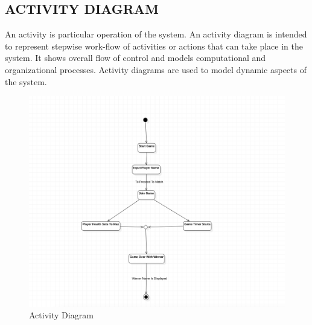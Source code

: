 \documentclass[12pt]{report}
\begin{document}
\subsection{ACTIVITY DIAGRAM}
An activity is particular operation of the system. An activity diagram is intended to represent
stepwise work-flow of activities or actions that can take place in the system. It shows overall
flow of control and models computational and organizational processes. Activity diagrams
are used to model dynamic aspects of the system. 
\setlength{\parindent}{0em}
\setlength{\parskip}{0em}
\begin{figure}[h]
\centering
\includegraphics[scale=0.42]{Activity.png}
\caption{ Activity Diagram}
\label{ Activity Diagram}
\end{figure}

\clearpage

\justifying
\setlength{\parindent}{4em}
\setlength{\parskip}{0.5em}
\renewcommand{\baselinestretch}{1.5}
\normalsize
\end{document}
